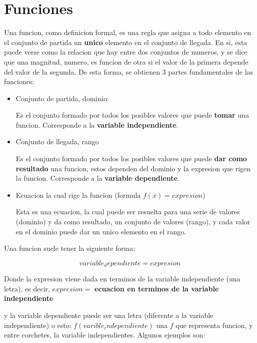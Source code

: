 \section{Funciones}

    Una funcion, como definicion formal, es una regla que asigna a todo
    elemento en el conjunto de partida
    un \textbf{unico} elemento en el conjunto de llegada. En si, esta puede verse
    como la relacion que hay entre dos conjuntos de numeros, y se dice que
    una magnitud, numero, es funcion de otra si el valor de la primera depende
    del valor de la segunda. De esta forma, se obtienen 3 partes fundamentales
    de las funciones:

    \begin{itemize}
        \item Conjunto de partida, dominio:

            Es el conjunto formado por todos los posibles valores que puede \textbf{tomar}
            una funcion. Corresponde a la \textbf{variable independiente}.

        \item Conjunto de llegada, rango

            Es el conjunto formado por todos los posibles valores que puede \textbf{dar
            como resultado} una funcion, estos dependen del dominio y la expresion
            que rigen la funcion. Corresponde a la \textbf{variable dependiente}.

        \item Ecuacion la cual rige la funcion (formula $f(x)= expresion$)

            Esta es una ecuacion, la cual puede ser resuelta para una serie de valores
            (dominio) y da como resultado, un conjunto de valores (rango), y cada
            valor en el dominio puede dar un unico elemento en el rango.
    \end{itemize}

    Una funcion suele tener la siguiente forma:

    $$ variable_dependiente = expresion $$

    Donde la expresion viene dada en terminos de la variable independiente (una letra), es
    decir, $ expresion= $  \textbf{ecuacion en terminos de la variable independiente}

    y la variable dependiente puede ser una letra (diferente a la variable independiente)
    o esto: $ f(varible_independiente) $ una $ f $ que representa funcion, y entre
    corchetes, la variable independientes. Algunos ejemplos son:

